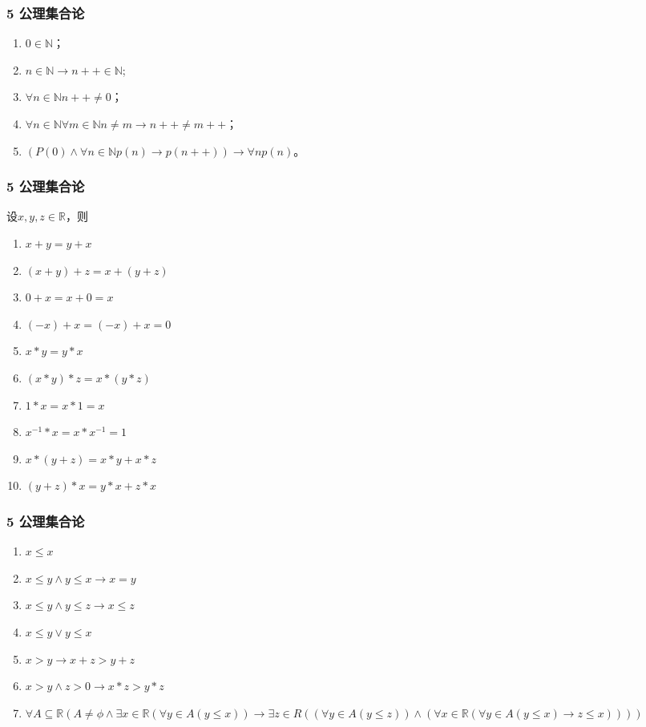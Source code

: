 \documentclass{beamer}
\begin{document}
\begin{CJK*}{UTF8}{gbsn}
\begin{frame}
  \frametitle{5 公理集合论}
  \begin{enumerate}
  \item $0 \in \mathbb{N}$；
  \item $n \in \mathbb{N} \rightarrow n ++ \in \mathbb{N}$;
  \item $\forall n \in \mathbb{N} n ++ \neq 0$；
  \item $\forall n \in \mathbb{N} \forall m \in \mathbb{N} n \neq m \rightarrow n ++ \neq m ++$；
    \item $(P(0) \land \forall n \in \mathbb{N} p(n) \rightarrow p(n++) )\rightarrow \forall n p(n)$。 
  \end{enumerate}
\end{frame}
\begin{frame}
  \frametitle{5 公理集合论}
   设$x, y, z \in \mathbb{R}$，则
   \begin{enumerate}
   \item   $x + y = y + x$
   \item   $(x + y) + z = x + (y + z)$
   \item   $0 + x = x + 0 = x$
   \item   $(-x) + x = (-x) + x = 0$
   \item   $x * y = y * x$
   \item   $(x * y) * z = x * (y *z)$
   \item   $1 * x = x * 1 = x$
   \item   $x^{-1} * x = x * x^{-1} = 1$
   \item   $x* (y + z) = x * y + x * z$
   \item   $(y + z) * x = y * x + z * x$
   
    \end{enumerate}
  \end{frame}
  \begin{frame}
  \frametitle{5 公理集合论}
    \begin{enumerate}
       \item $x \leq x$
   \item $ x \leq y \land y \leq x \rightarrow x = y$
   \item $x \leq y \land y \leq z \rightarrow x \leq z$
   \item $x \leq y \lor y \leq x$ 
\item $x > y \rightarrow x + z > y + z$
\item $x > y \land z >0 \rightarrow x * z > y * z$
\item   $\forall A \subseteq \mathbb{R} (A \neq \phi \land \exists x \in \mathbb{R} (\forall y \in A (y \leq x)) \rightarrow \exists z \in R ((\forall y \in A (y \leq z) )\land ( \forall x \in \mathbb{R} (\forall y \in A (y \leq x) \rightarrow z \leq x))))$
\end{enumerate}
\end{frame}

\end{CJK*}
\end{document}
